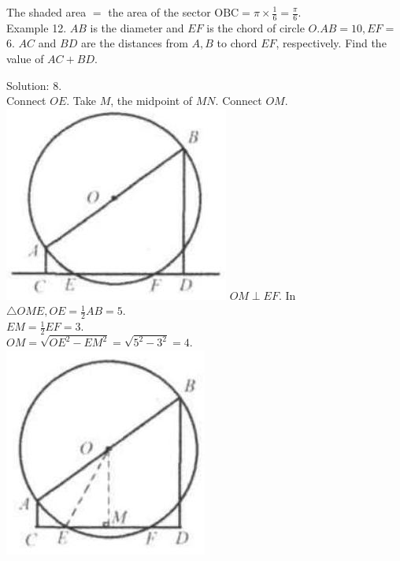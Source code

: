 \documentclass[10pt]{article}
\begin{document}
The shaded area \(=\) the area of the sector \(\mathrm{OBC}=\pi \times \frac{1}{6}=\frac{\pi}{6}\).\\
Example 12. \(A B\) is the diameter and \(E F\) is the chord of circle \(O . A B=10, E F=\) 6. \(A C\) and \(B D\) are the distances from \(A, B\) to chord \(E F\), respectively. Find the value of \(A C+B D\).

Solution: 8.\\
Connect \(O E\). Take \(M\), the midpoint of \(M N\). Connect \(O M\).\\
\includegraphics[max width=\textwidth]{2025_04_17_97bc1f7e44d93c271a88g-152(3)} \(O M \perp E F\). In \(\triangle O M E, O E=\frac{1}{2} A B=5\).\\
\(E M=\frac{1}{2} E F=3\).\\
\(O M=\sqrt{O E^{2}-E M^{2}}=\sqrt{5^{2}-3^{2}}=4\).\\
\includegraphics[max width=\textwidth, center]{2025_04_17_97bc1f7e44d93c271a88g-152(2)}
\end{document}
